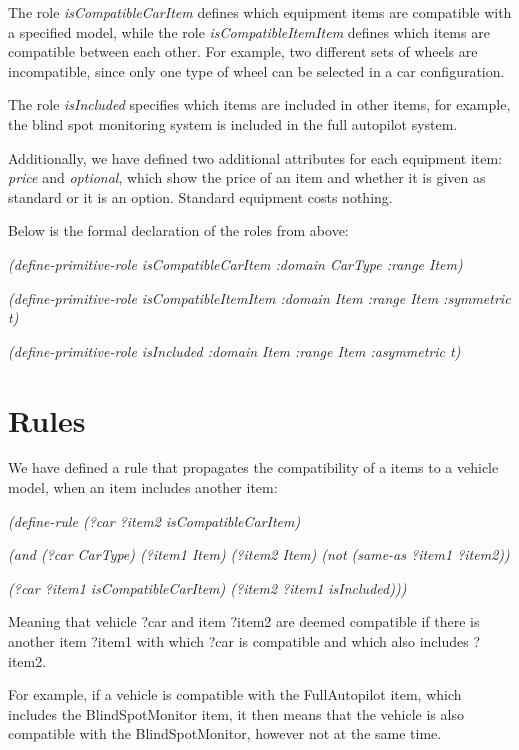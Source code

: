 \documentclass[a4paper,12pt]{report}
\begin{document}
The role \textit{isCompatibleCarItem} defines which equipment items are compatible with a specified model, while the role \textit{isCompatibleItemItem} defines which items are compatible between each other. For example, two different sets of wheels are incompatible, since only one type of wheel can be selected in a car configuration.

\bigskip
The role \textit{isIncluded} specifies which items are included in other items, for example, the blind spot monitoring system is included in the full autopilot system.

\bigskip
Additionally, we have defined two additional attributes for each equipment item: \textit{price} and \textit{optional}, which show the price of an item and whether it is given as standard or it is an option. Standard equipment costs nothing.

\bigskip
Below is the formal declaration of the roles from above:
\bigskip

\textit{(define-primitive-role isCompatibleCarItem :domain CarType :range Item)}

\textit{(define-primitive-role isCompatibleItemItem :domain Item :range Item  :symmetric t)}

\textit{(define-primitive-role isIncluded :domain Item :range Item :asymmetric t)}

\chapter{Rules}
We have defined a rule that propagates the compatibility of a items to a vehicle model, when an item includes another item:

\begin{center}
    \textit{(define-rule (?car ?item2 isCompatibleCarItem)}
    
    \textit{(and (?car CarType) (?item1 Item) (?item2 Item) (not (same-as ?item1 ?item2))}
    
    \textit{(?car ?item1 isCompatibleCarItem) (?item2 ?item1 isIncluded))) }

\end{center} 

Meaning that vehicle ?car and item ?item2 are deemed compatible if there is another item ?item1 with which ?car is compatible and which also includes ?item2.

\bigskip
For example, if a vehicle is compatible with the FullAutopilot item, which includes the BlindSpotMonitor item, it then means that the vehicle is also compatible with the BlindSpotMonitor, however not at the same time.
\end{document}
